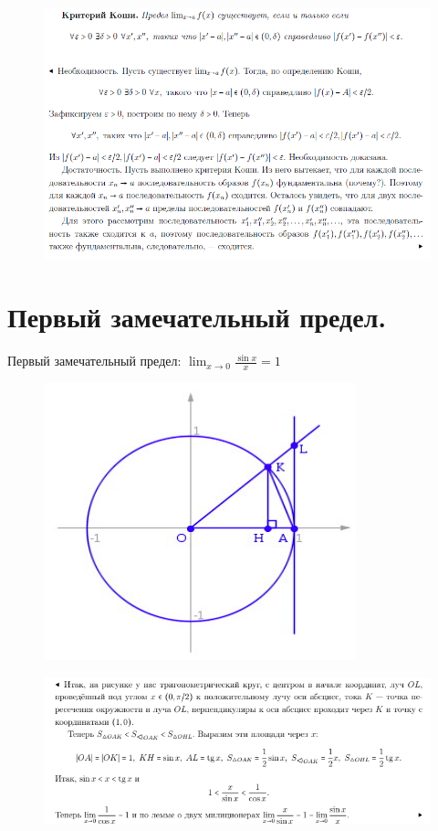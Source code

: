  \begin{figure}[h!]
\centering
\includegraphics[scale=0.8]{Pictures/23.PNG}
\end{figure}



\section{Первый замечательный предел.}

Первый замечательный предел: 
$\lim_{x \rightarrow 0} \frac{\sin{x}}{x} = 1$\\
 \begin{figure}[h!]
\centering
\includegraphics[scale=0.7]{Pictures/24_1.png}
\end{figure}
 \begin{figure}[h!]
\centering
\includegraphics[scale=0.7]{Pictures/24_2.png}
\end{figure}

